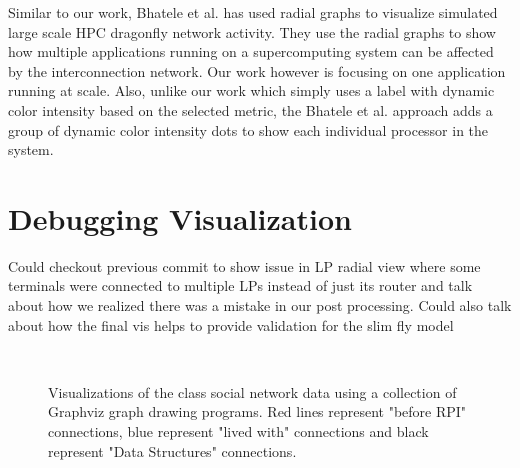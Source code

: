 \documentclass{acm_proc_article-sp}
\begin{document}
Similar to our work, Bhatele et al. \cite{DragonVis} has used radial graphs to visualize simulated large scale HPC dragonfly network activity. They use the radial graphs to show how multiple applications running on a supercomputing system can be affected by the interconnection network. Our work however is focusing on one application running at scale. Also, unlike our work which simply uses a label with dynamic color intensity based on the selected metric, the Bhatele et al. approach adds a group of dynamic color intensity dots to show each individual processor in the system. 

\section{Debugging Visualization}
\color{red} Could checkout previous commit to show issue in LP radial view where some terminals were connected to multiple LPs instead of just its router and talk about how we realized there was a mistake in our post processing.  Could also talk about how the final vis helps to provide validation for the slim fly model \color{black}

\begin{figure}[!ht]
     \centering
     \\
          \caption{Visualizations of the class social network data using a collection of Graphviz graph drawing programs. Red lines represent "before RPI" connections, blue represent "lived with" connections and black represent "Data Structures" connections. }
     \label{class-net}
\end{figure}
\end{document}
